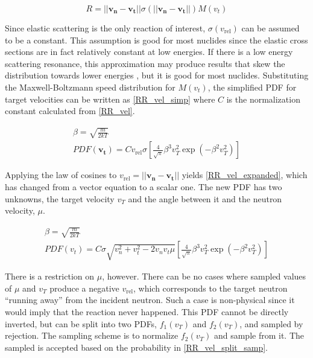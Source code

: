 \begin{equation}
\label{RR_vel}
R = ||\boldsymbol{v_n}-\boldsymbol{v_t}|| \sigma(||\boldsymbol{v_n}-\boldsymbol{v_t}||) M(v_t)
\end{equation}

Since elastic scattering is the only reaction of interest, $\sigma(v_\mathrm{rel})$ can be assumed to be a constant.  This assumption is good for most nuclides since the elastic cross sections are in fact relatively constant at low energies.  If there is a low energy scattering resonance, this approximation may produce results that skew the distribution towards lower energies \cite{openmc}, but it is good for most nuclides.  Substituting the Maxwell-Boltzmann speed distribution for $M(v_t)$, the simplified PDF for target velocities can be written as \eqref{RR_vel_simp} where $C$ is the normalization constant calculated from \eqref{RR_vel}.

\begin{equation}
\label{RR_vel_simp}
\begin{gathered}
\beta = \sqrt{\frac{m}{2kT}} \\
PDF(\boldsymbol{v_t}) = C v_\mathrm{rel} \sigma \left[   \frac{4}{\sqrt{\pi}} \beta^3 v_T^2  \exp (- \beta^2  v_T^2 )      \right]
\end{gathered}
\end{equation}

Applying the law of cosines to $v_\mathrm{rel} = ||\boldsymbol{v_n}-\boldsymbol{v_t}||$ yields \eqref{RR_vel_expanded}, which has changed from a vector equation to a scalar one.   The new PDF has two unknowns, the target velocity $v_T$ and the angle between it and the neutron velocity, $\mu$.

\begin{equation}
\label{RR_vel_expanded}
\begin{gathered}
\beta = \sqrt{\frac{m}{2kT}} \\
PDF(v_t) = C \sigma  \sqrt{v_n^2+v_t^2-2 v_n v_t \mu} \left[   \frac{4}{\sqrt{\pi}} \beta^3 v_T^2  \exp ( -\beta^2  v_T^2 )      \right]
\end{gathered}
\end{equation}

There is a restriction on $\mu$, however.  There can be no cases where sampled values of $\mu$ and $v_T$ produce a negative $v_\mathrm{rel}$, which corresponds to the target neutron ``running away'' from the incident neutron.  Such a case is non-physical since it would imply that the reaction never happened.  This PDF cannot be directly inverted, but can be split into two PDFs, $f_1(v_T)$ and $f_2(v_T)$, and sampled by rejection.  The sampling scheme is to normalize $f_2(v_T)$ and sample from it.  The sampled is accepted based on the probability in \eqref{RR_vel_split_samp}\cite{openmc}.

